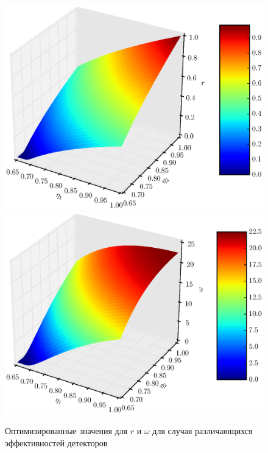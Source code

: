 \documentclass[%
master,         %
subf,           %
href,           %
,times         %
]{disser}
\numberwithin{equation}{section}
\numberwithin{figure}{section}
\begin{document}
\begin{figure}[h]
\includegraphics[scale=0.7]{r3d.eps}
\includegraphics[scale=0.7]{omega3d.eps}
\caption{Оптимизированные значения для $r$ и $\omega$ для случая различающихся эффективностей детекторов}
\label{fig:psi_opt_3d}
\end{figure}
\end{document}

